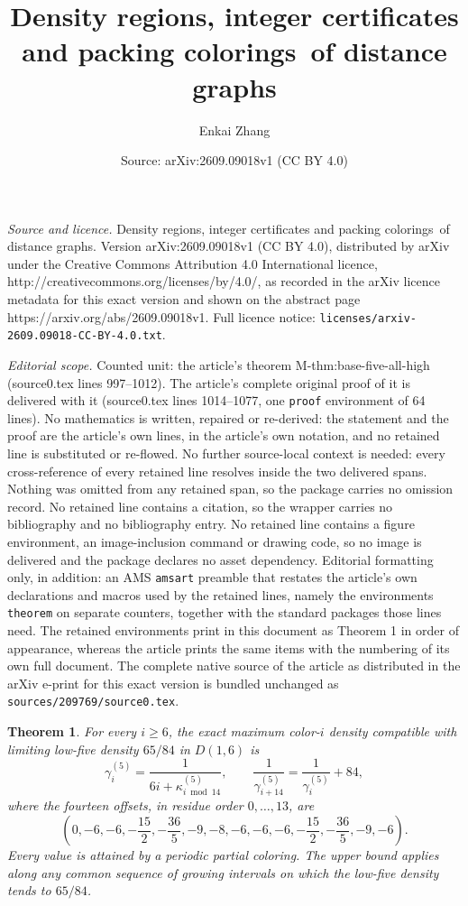 \documentclass[10pt,a4paper]{amsart}
\title{Density regions, integer certificates and packing colorings\ of distance graphs}
\author{Enkai Zhang}
\date{Source: arXiv:2609.09018v1 (CC BY 4.0)}
\newtheorem{theorem}{Theorem}
\newcommand{\D}[1]{D(1,#1)}
\begin{document}
\maketitle

\noindent\emph{Source and licence.} Density regions, integer certificates and packing colorings\ of distance graphs. Version arXiv:2609.09018v1 (CC BY 4.0), distributed by arXiv under the Creative Commons Attribution 4.0 International licence, http://creativecommons.org/licenses/by/4.0/, as recorded in the arXiv licence metadata for this exact version and shown on the abstract page https://arxiv.org/abs/2609.09018v1. Full licence notice: \texttt{licenses/arxiv-2609.09018-CC-BY-4.0.txt}.\par\smallskip

\noindent\textit{Editorial scope.} Counted unit: the article's theorem M-thm:base-five-all-high (source0.tex lines 997--1012). The article's complete original proof of it is delivered with it (source0.tex lines 1014--1077, one \texttt{proof} environment of 64 lines). No mathematics is written, repaired or re-derived: the statement and the proof are the article's own lines, in the article's own notation, and no retained line is substituted or re-flowed.  No further source-local context is needed: every cross-reference of every retained line resolves inside the two delivered spans.  Nothing was omitted from any retained span, so the package carries no omission record.  No retained line contains a citation, so the wrapper carries no bibliography and no bibliography entry.  No retained line contains a figure environment, an image-inclusion command or drawing code, so no image is delivered and the package declares no asset dependency.  Editorial formatting only, in addition: an AMS \texttt{amsart} preamble that restates the article's own declarations and macros used by the retained lines, namely the environments \texttt{theorem} on separate counters, together with the standard packages those lines need.  The retained environments print in this document as Theorem 1 in order of appearance, whereas the article prints the same items with the numbering of its own full document.  The complete native source of the article as distributed in the arXiv e-print for this exact version is bundled unchanged as \texttt{sources/209769/source0.tex}.
\begin{theorem}\label{M-thm:base-five-all-high}
For every $i\ge6$, the exact maximum color-$i$ density compatible with
limiting low-five density $65/84$ in $\D{6}$ is
\[
 \gamma_i^{(5)}=\frac1{6i+\kappa^{(5)}_{i\bmod14}},
 \qquad \frac1{\gamma_{i+14}^{(5)}}=\frac1{\gamma_i^{(5)}}+84,
\]
where the fourteen offsets, in residue order $0,\ldots,13$, are
\[
 \left(0,-6,-6,-\frac{15}{2},-\frac{36}{5},-9,-8,
       -6,-6,-6,-\frac{15}{2},-\frac{36}{5},-9,-6\right).
\]
Every value is attained by a periodic partial coloring. The upper bound
applies along any common sequence of growing intervals on which the
low-five density tends to $65/84$.
\end{theorem}
\end{document}
